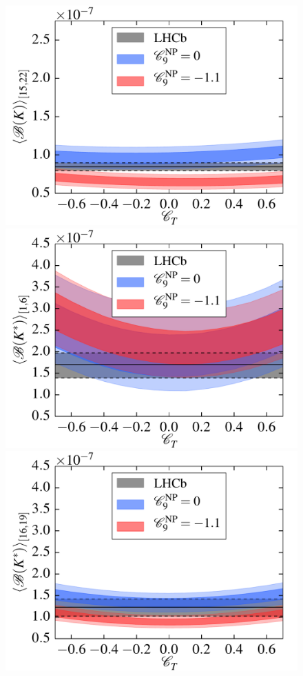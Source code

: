 \documentclass[twocolumn,epjc3]{svjour3}
\numberwithin{equation}{section}
\renewcommand{\[}{\big[}
\renewcommand{\]}{\big]}
\renewcommand{\(}{\big(}
\renewcommand{\)}{\big)}
\newlength{\relwidth}
\begin{document}
\begin{figure}
\begin{center}
    \includegraphics[width=\relwidth]{plots/pdf/ct_K_BR15to22}
    \\
    \includegraphics[width=\relwidth]{plots/pdf/ct_Kstar_BR1to6}
    \includegraphics[width=\relwidth]{plots/pdf/ct_Kstar_BR16to19}

\end{center}
\end{figure}
\end{document}
